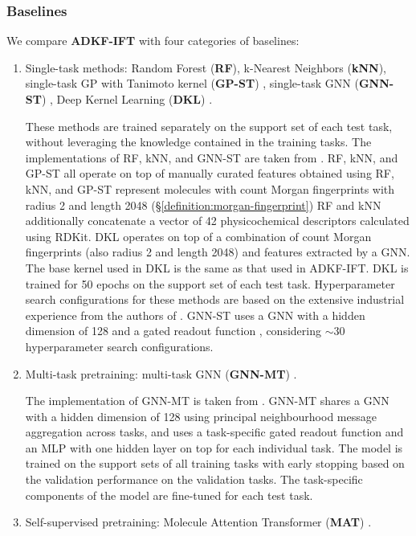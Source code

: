         \subsubsection{Baselines}
        We compare \textbf{ADKF-IFT} with four categories of baselines:
        \begin{enumerate}
            \item Single-task methods: Random Forest (\textbf{RF}), k-Nearest Neighbors (\textbf{kNN}),
                single-task GP with Tanimoto kernel (\textbf{GP-ST}) \citep{ralaivola2005graph}, single-task GNN
                (\textbf{GNN-ST}) \citep{gilmer2017neural}, Deep Kernel Learning (\textbf{DKL}) \citep{wilson2016deep}.

                These methods are trained separately on the
                support set of each test task, without leveraging the knowledge contained in the
                training tasks. The implementations of RF, kNN, and GNN-ST are taken from \citet{stanley2021fsmol}.
                RF, kNN, and GP-ST all operate on top of manually curated features obtained using 
                RF, kNN, and GP-ST represent molecules with count Morgan fingerprints with radius 2 and length 2048
                (\S\ref{definition:morgan-fingerprint})
                RF and kNN additionally concatenate a vector of 42 physicochemical descriptors
                calculated using RDKit.
                DKL operates on top of a combination of count Morgan fingerprints (also radius 2 and length 2048)
                and features extracted by a GNN.
                The base kernel used in DKL is the same as that used in ADKF-IFT.
                DKL is trained for 50 epochs on the support set of each test task.
                Hyperparameter search configurations for these methods are based on the
                extensive industrial experience from the authors of \citet{stanley2021fsmol}.
                GNN-ST uses a GNN with a hidden dimension of 128 and a gated readout function
                \citep{gilmer2017neural}, considering $\sim30$ hyperparameter search configurations.
            \item Multi-task pretraining: multi-task GNN (\textbf{GNN-MT}) \citep{corso2020principal,gilmer2017neural}.

                The implementation of GNN-MT is taken from \citet{stanley2021fsmol}.
                GNN-MT shares a GNN with a hidden dimension of 128 using principal neighbourhood
                message aggregation \citep{corso2020principal} across tasks, and uses a task-specific
                gated readout function \citep{gilmer2017neural} and an MLP with one hidden layer on top
                for each individual task. The model is trained on the support sets of all training
                tasks with early stopping based on the validation performance on the validation
                tasks. The task-specific components of the model are fine-tuned for each test task.
            \item Self-supervised pretraining: Molecule Attention Transformer (\textbf{MAT}) \citep{maziarka2020molecule}.


\end{enumerate}
